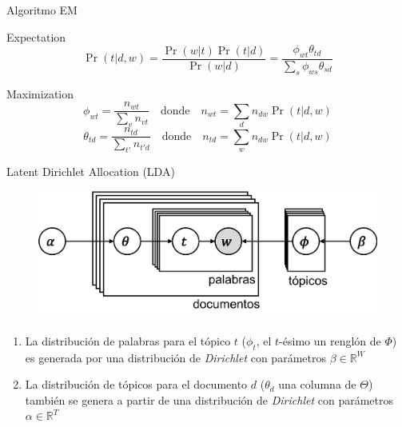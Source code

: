 \documentclass[presentation, t]{beamer}
\begin{document}

\begin{frame}{Algoritmo EM}
\begin{block}{Expectation}
\[\Pr(t|d,w) = \frac{\Pr(w|t)\Pr(t|d)}{\Pr(w|d)} = \frac{\phi_{wt}\theta_{td}}{\sum_{s}\phi_{ws}\theta_{sd}}\]\vfill
\end{block}

\begin{block}{Maximization}
\[\phi_{wt} = \frac{n_{wt}}{\sum_{v}n_{vt}} \quad \text{donde} \quad n_{wt} = \sum_{d}n_{dw}\Pr(t|d,w)\]
\[\theta_{td} = \frac{n_{td}}{\sum_{t'}n_{t'd}} \quad \text{donde} \quad n_{td} = \sum_{w}n_{dw}\Pr(t|d,w)\]\vfill
\end{block}
\end{frame}


\begin{frame}{Latent Dirichlet Allocation (LDA)}
\begin{figure}[htbp]
\centering
\includegraphics[width=.75\textwidth]{./imagenes/lda.png}
\end{figure}

\begin{enumerate}
\item La distribución de palabras para el tópico \(t\) (\(\phi_t\), el \(t\)-ésimo un renglón de \(\Phi\)) es
generada por una distribución de \emph{Dirichlet} con parámetros \(\beta \in \mathbb{R}^W\)

\item La distribución de tópicos para el documento \(d\) (\(\theta_d\) una columna de \(\Theta\)) también se genera a partir
de una distribución de \emph{Dirichlet} con parámetros \(\alpha \in \mathbb{R}^T\)
\end{enumerate}
\end{frame}

\end{document}

